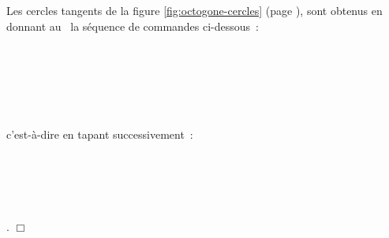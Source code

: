 \begin{corrige}{
Les cercles tangents de la figure \ref{fig:octogone-cercles} (page \pageref{fig:octogone-cercles}), 
sont obtenus en donnant au \robot\ la séquence de commandes \hbox{ci-dessous~:}\\
\hspace*{2ex}{\idt phtd()}\\
\hspace*{2ex}{\idt vd();\ vd();\ vd();\ vd();\ vd();\ vd()}\\
\hspace*{2ex}{\idt phtg()}\\
\hspace*{2ex}{\idt vg();\ vg();\ vg();\ vg();\ vg();\ vg()}\\
\hspace*{2ex}{\idt phtg()}\\
\hspace*{2ex}{\idt vd();\ vd();\ vd();\ vd()}\\
c'est-à-dire en tapant  \hbox{successivement~:}\\
\hspace*{1ex} \\
\hspace*{1ex}\touche{)} \touche{)} \touche{)} \touche{)} \touche{)} \touche{)} \\
\hspace*{1ex} \\
\hspace*{1ex}\touche{(} \touche{(} \touche{(} \touche{(} \touche{(} \touche{(} \\
\hspace*{1ex} \\
\hspace*{1ex}\touche{)} \touche{)} \touche{)} \touche{)}. 
$\Box$}\end{corrige}

